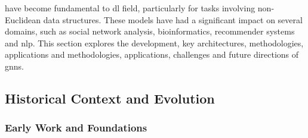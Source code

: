  have become fundamental to \acrlong{dl} field, particularly for tasks involving non-Euclidean data structures.
These models have had a significant impact on several domains, such as social network analysis, bioinformatics, recommender systems and \gls{nlp}.
This section explores the development, key architectures, methodologies, applications and methodologies, applications, challenges and future directions of \glspl{gnn}.

\subsection*{Historical Context and Evolution}

\subsubsection*{Early Work and Foundations}

